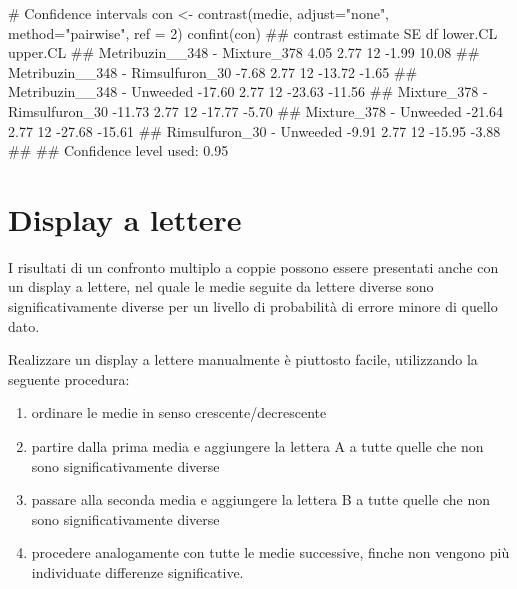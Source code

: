 \documentclass[a4paper,12pt,oneside]{book}
\providecommand{\tightlist}{%
  \setlength{\itemsep}{0pt}\setlength{\parskip}{0pt}}
\newenvironment{Shaded}{\begin{snugshade}}{\end{snugshade}}
\newcommand{\DecValTok}[1]{#1}
\newcommand{\StringTok}[1]{#1}
\newcommand{\CommentTok}[1]{#1}
\newcommand{\DocumentationTok}[1]{#1}
\newcommand{\OtherTok}[1]{#1}
\newcommand{\FunctionTok}[1]{#1}
\newcommand{\AttributeTok}[1]{#1}
\newcommand{\NormalTok}[1]{#1}
\begin{document}
\small

\begin{Shaded}
\begin{Highlighting}[]
\CommentTok{\# Confidence intervals}
\NormalTok{con }\OtherTok{\textless{}{-}} \FunctionTok{contrast}\NormalTok{(medie, }\AttributeTok{adjust=}\StringTok{"none"}\NormalTok{, }
                \AttributeTok{method=}\StringTok{"pairwise"}\NormalTok{, }\AttributeTok{ref =} \DecValTok{2}\NormalTok{)}
\FunctionTok{confint}\NormalTok{(con)}
\DocumentationTok{\#\#  contrast                         estimate   SE df lower.CL upper.CL}
\DocumentationTok{\#\#  Metribuzin\_\_348 {-} Mixture\_378        4.05 2.77 12    {-}1.99    10.08}
\DocumentationTok{\#\#  Metribuzin\_\_348 {-} Rimsulfuron\_30    {-}7.68 2.77 12   {-}13.72    {-}1.65}
\DocumentationTok{\#\#  Metribuzin\_\_348 {-} Unweeded         {-}17.60 2.77 12   {-}23.63   {-}11.56}
\DocumentationTok{\#\#  Mixture\_378 {-} Rimsulfuron\_30       {-}11.73 2.77 12   {-}17.77    {-}5.70}
\DocumentationTok{\#\#  Mixture\_378 {-} Unweeded             {-}21.64 2.77 12   {-}27.68   {-}15.61}
\DocumentationTok{\#\#  Rimsulfuron\_30 {-} Unweeded           {-}9.91 2.77 12   {-}15.95    {-}3.88}
\DocumentationTok{\#\# }
\DocumentationTok{\#\# Confidence level used: 0.95}
\end{Highlighting}
\end{Shaded}

\normalsize

\hypertarget{display-a-lettere}{%
\section{Display a lettere}\label{display-a-lettere}}

I risultati di un confronto multiplo a coppie possono essere presentati anche con un display a lettere, nel quale le medie seguite da lettere diverse sono significativamente diverse per un livello di probabilità di errore minore di quello dato.

Realizzare un display a lettere manualmente è piuttosto facile, utilizzando la seguente procedura:

\begin{enumerate}
\def\labelenumi{\arabic{enumi}.}
\tightlist
\item
  ordinare le medie in senso crescente/decrescente
\item
  partire dalla prima media e aggiungere la lettera A a tutte quelle che non sono significativamente diverse
\item
  passare alla seconda media e aggiungere la lettera B a tutte quelle che non sono significativamente diverse
\item
  procedere analogamente con tutte le medie successive, finche non vengono più individuate differenze significative.
\end{enumerate}
\end{document}
